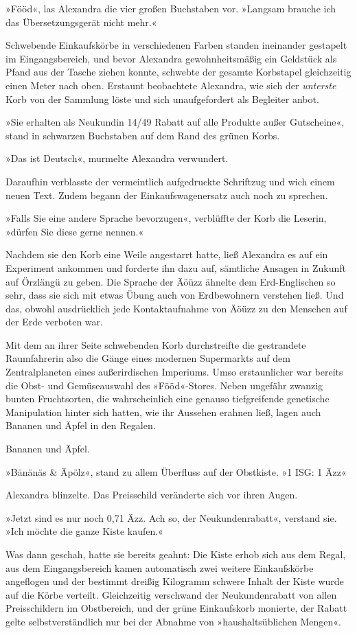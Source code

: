 »Fööd«, las Alexandra die vier großen Buchstaben vor. »Langsam brauche ich das Übersetzungsgerät nicht mehr.«

Schwebende Einkaufskörbe in verschiedenen Farben standen ineinander gestapelt im Eingangsbereich, und bevor Alexandra gewohnheitsmäßig ein Geldstück als Pfand aus der Tasche ziehen konnte, schwebte der gesamte Korbstapel gleichzeitig einen Meter nach oben. Erstaunt beobachtete Alexandra, wie sich der \emph{unterste} Korb von der Sammlung löste und sich unaufgefordert als Begleiter anbot.

»Sie erhalten als Neukundin 14/49 Rabatt auf alle Produkte außer Gutscheine«, stand in schwarzen Buchstaben auf dem Rand des grünen Korbs.

»Das ist Deutsch«, murmelte Alexandra verwundert.

Daraufhin verblasste der vermeintlich aufgedruckte Schriftzug und wich einem neuen Text. Zudem begann der Einkaufswagenersatz auch noch zu sprechen.

»Falls Sie eine andere Sprache bevorzugen«, verblüffte der Korb die Leserin, »dürfen Sie diese gerne nennen.«

Nachdem sie den Korb eine Weile angestarrt hatte, ließ Alexandra es auf ein Experiment ankommen und forderte ihn dazu auf, sämtliche Ansagen in Zukunft auf Örzlängü zu geben. Die Sprache der Äöüzz ähnelte dem Erd-Englischen so sehr, dass sie sich mit etwas Übung auch von Erdbewohnern verstehen ließ. Und das, obwohl ausdrücklich jede Kontaktaufnahme von Äöüzz zu den Menschen auf der Erde verboten war.

Mit dem an ihrer Seite schwebenden Korb durchstreifte die gestrandete Raumfahrerin also die Gänge eines modernen Supermarkts auf dem Zentralplaneten eines außerirdischen Imperiums. Umso erstaunlicher war bereits die Obst- und Gemüseauswahl des »Fööd«-Stores. Neben ungefähr zwanzig bunten Fruchtsorten, die wahrscheinlich eine genauso tiefgreifende genetische Manipulation hinter sich hatten, wie ihr Aussehen erahnen ließ, lagen auch Bananen und Äpfel in den Regalen.

Bananen und Äpfel.

»Bänänäs \& Äpölz«, stand zu allem Überfluss auf der Obstkiste. »1 ISG: 1 Äzz«

Alexandra blinzelte. Das Preisschild veränderte sich vor ihren Augen.

»Jetzt sind es nur noch 0,71 Äzz. Ach so, der Neukundenrabatt«, verstand sie. »Ich möchte die ganze Kiste kaufen.«

Was dann geschah, hatte sie bereits geahnt: Die Kiste erhob sich aus dem Regal, aus dem Eingangsbereich kamen automatisch zwei weitere Einkaufskörbe angeflogen und der bestimmt dreißig Kilogramm schwere Inhalt der Kiste wurde auf die Körbe verteilt. Gleichzeitig verschwand der Neukundenrabatt von allen Preisschildern im Obstbereich, und der grüne Einkaufskorb monierte, der Rabatt gelte selbstverständlich nur bei der Abnahme von »haushaltsüblichen Mengen«.


